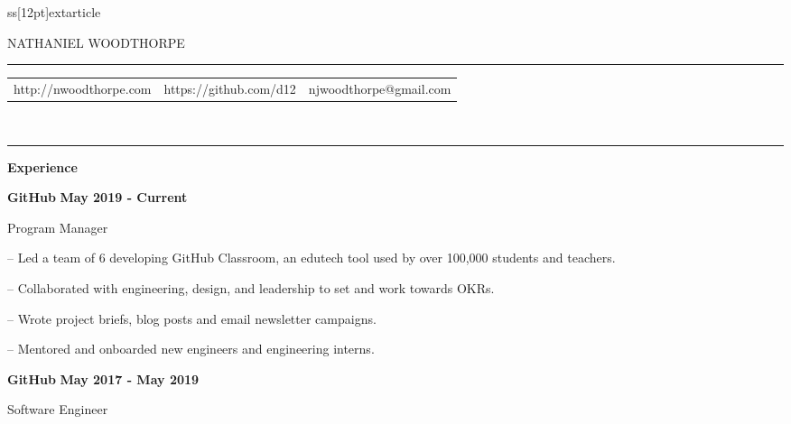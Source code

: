 ss[12pt]{extarticle}
\usepackage[margin=0.4in]{geometry}
\usepackage{multicol}
\usepackage{hyperref}
\usepackage{paralist}
\setlength{\columnseprule}{0.4pt}

{\selectfont
    \begin{center}
        {\LARGE {NATHANIEL WOODTHORPE}}
        \\
        \vspace{0.4cm}
        \hrule
        \vspace{0.4cm}

        \begin{tabular}{c c c}
            http://nwoodthorpe.com & https://github.com/d12 & njwoodthorpe@gmail.com
        \end{tabular}
        \vspace{0.22cm}
        \\
        \hrule
    \end{center}
    \vspace{0.3cm}
    {\large \textbf{Experience}}\\

    \vspace{-0.3cm}
    {\indent
        \textbf{GitHub} \hfill \textbf{May 2019 - Current}

        Program Manager

        \begin{compactitem}
            \setlength{\itemindent}{0.5cm}
            \item[--] Led a team of 6 developing GitHub Classroom, an edutech tool used by over 100,000 students and teachers.
            \item[--] Collaborated with engineering, design, and leadership to set and work towards OKRs.
            \item[--] Wrote project briefs, blog posts and email newsletter campaigns.
            \item[--] Mentored and onboarded new engineers and engineering interns.
        \end{compactitem}
    }

    \vspace{0.3cm}

    {\indent
        \textbf{GitHub} \hfill \textbf{May 2017 - May 2019}

        Software Engineer

}}
